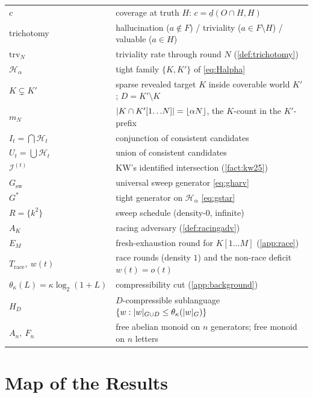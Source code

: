 \documentclass[11pt]{article}
\numberwithin{equation}{section}
\newcommand{\mc}[1]{\mathcal{#1}}
\DeclarePairedDelimiter{\abs}{\lvert}{\rvert}
\newcommand{\Amb}{F}
\newcommand{\Val}{H}
\newcommand{\Hcal}{\mc{H}}
\newcommand{\Hfam}{\Hcal_{\alpha}}
\newcommand{\Out}{O}
\newcommand{\Comp}[1]{H_{#1}}
\newcommand{\dlow}[2]{\underline{d}(#1,#2)}
\newcommand{\trv}{\mathrm{trv}}
\newcommand{\cov}{c}
\newcommand{\rest}[2]{#1[1\!\dots\! #2]}
\theoremstyle{plain}
\theoremstyle{definition}
\theoremstyle{remark}
\begin{document}
\begin{center}
\begin{tabular}{@{}ll@{}}
$\cov$ & coverage at truth $\Val$: $\cov = \dlow{\Out \cap \Val}{\Val}$ \\
trichotomy & hallucination ($a \notin \Amb$) / triviality ($a \in \Amb \setminus \Val$) / valuable ($a \in \Val$) \\
$\trv_N$ & triviality rate through round $N$ (\cref{def:trichotomy}) \\
$\Hfam$ & tight family $\{K, K'\}$ of \eqref{eq:Halpha} \\
$K \subsetneq K'$ & sparse revealed target $K$ inside coverable world $K'$; $D = K' \setminus K$ \\
$m_N$ & $\abs{K \cap \rest{K'}{N}} = \lfloor \alpha N \rfloor$, the $K$-count in the $K'$-prefix \\
$I_t = \bigcap \Hcal_t$ & conjunction of consistent candidates \\
$U_t = \bigcup \Hcal_t$ & union of consistent candidates \\
$\mc I^{(t)}$ & KW's identified intersection (\cref{fact:kw25}) \\
$G_{\mathrm{sw}}$ & universal sweep generator \eqref{eq:gharv} \\
$G^*$ & tight generator on $\Hfam$ \eqref{eq:gstar} \\
$R = \{k^2\}$ & sweep schedule (density-$0$, infinite) \\
$A_K$ & racing adversary (\cref{def:racingadv}) \\
$E_M$ & fresh-exhaustion round for $\rest{K}{M}$ (\cref{app:race}) \\
$T_{\mathrm{race}},\ w(t)$ & race rounds (density $1$) and the non-race deficit $w(t) = o(t)$ \\
$\theta_\kappa(L) = \kappa \log_2(1+L)$ & compressibility cut (\cref{app:background}) \\
$\Comp{D}$ & $D$-compressible sublanguage $\{w : \abs{w}_{G \cup D} \le \theta_\kappa(\abs{w}_G)\}$ \\
$A_n,\ F_n$ & free abelian monoid on $n$ generators; free monoid on $n$ letters \\
\bottomrule
\end{tabular}
\end{center}
\renewcommand{\arraystretch}{1}

\section{Map of the Results}
\label{app:map}
\end{document}

